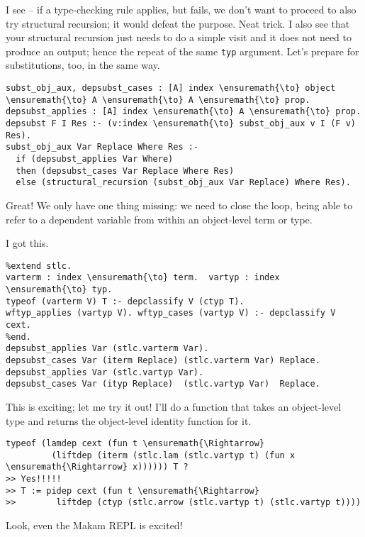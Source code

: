 \heroSTUDENT{} I see -- if a type-checking rule applies, but fails, we don't
want to proceed to also try structural recursion; it would defeat the
purpose. Neat trick. I also see that your structural recursion just
needs to do a simple visit and it does not need to produce an output;
hence the repeat of the same \texttt{typ} argument. Let's prepare for
substitutions, too, in the same way.

\begin{verbatim}
subst_obj_aux, depsubst_cases : [A] index \ensuremath{\to} object \ensuremath{\to} A \ensuremath{\to} A \ensuremath{\to} prop.
depsubst_applies : [A] index \ensuremath{\to} A \ensuremath{\to} prop.
depsubst F I Res :- (v:index \ensuremath{\to} subst_obj_aux v I (F v) Res).
subst_obj_aux Var Replace Where Res :-
  if (depsubst_applies Var Where)
  then (depsubst_cases Var Replace Where Res)
  else (structural_recursion (subst_obj_aux Var Replace) Where Res).
\end{verbatim}

\heroADVISOR{} Great! We only have one thing missing: we need to close the
loop, being able to refer to a dependent variable from within an
object-level term or type.

\heroSTUDENT{} I got this.

\begin{verbatim}
%extend stlc.
varterm : index \ensuremath{\to} term.  vartyp : index \ensuremath{\to} typ.
typeof (varterm V) T :- depclassify V (ctyp T).
wftyp_applies (vartyp V). wftyp_cases (vartyp V) :- depclassify V cext.
%end.
depsubst_applies Var (stlc.varterm Var).
depsubst_cases Var (iterm Replace) (stlc.varterm Var) Replace.
depsubst_applies Var (stlc.vartyp Var).
depsubst_cases Var (ityp Replace)  (stlc.vartyp Var)  Replace.
\end{verbatim}

\heroADVISOR{} This is exciting; let me try it out! I'll do a function that
takes an object-level type and returns the object-level identity
function for it.

\begin{verbatim}
typeof (lamdep cext (fun t \ensuremath{\Rightarrow}
         (liftdep (iterm (stlc.lam (stlc.vartyp t) (fun x \ensuremath{\Rightarrow} x)))))) T ?
>> Yes!!!!!
>> T := pidep cext (fun t \ensuremath{\Rightarrow}
>>        liftdep (ctyp (stlc.arrow (stlc.vartyp t) (stlc.vartyp t))))
\end{verbatim}

\heroSTUDENT{} Look, even the Makam REPL is excited!

